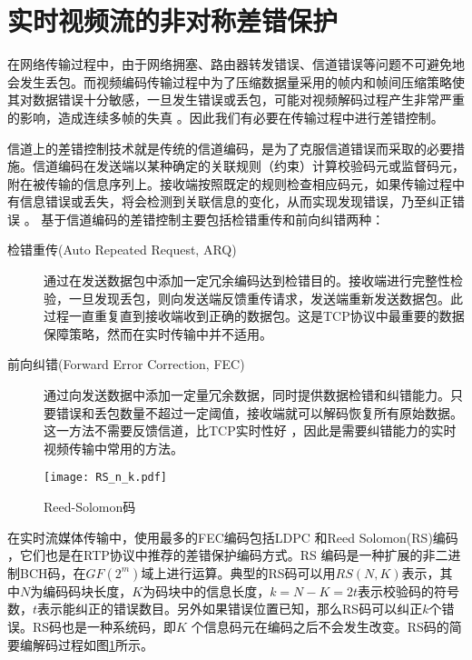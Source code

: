 \section{实时视频流的非对称差错保护}
\label{section:fec_intro}
在网络传输过程中，由于网络拥塞、路由器转发错误、信道错误等问题不可避免地会发生丢包。而视频编码传输过程中为了压缩数据量采用的帧内和帧间压缩策略使其对数据错误十分敏感，一旦发生错误或丢包，可能对视频解码过程产生非常严重的影响，造成连续多帧的失真 \cite{stockhammer2003h}。因此我们有必要在传输过程中进行差错控制。

信道上的差错控制技术就是传统的信道编码，是为了克服信道错误而采取的必要措施。信道编码在发送端以某种确定的关联规则（约束）计算校验码元或监督码元，附在被传输的信息序列上。接收端按照既定的规则检查相应码元，如果传输过程中有信息错误或丢失，将会检测到关联信息的变化，从而实现发现错误，乃至纠正错误 \cite{陈敏2004网络实时视频传输研究, wang1998error, wang2000error} 。
基于信道编码的差错控制主要包括检错重传和前向纠错两种：
\begin{description}
    \item[检错重传(Auto Repeated Request, ARQ) \cite{soltani2009delay, schier2012optimizing}] 通过在发送数据包中添加一定冗余编码达到检错目的。接收端进行完整性检验，一旦发现丢包，则向发送端反馈重传请求，发送端重新发送数据包。此过程一直重复直到接收端收到正确的数据包。这是TCP协议中最重要的数据保障策略，然而在实时传输中并不适用。
    \item[前向纠错(Forward Error Correction, FEC) \cite{nafaa2008forward}] 通过向发送数据中添加一定量冗余数据，同时提供数据检错和纠错能力。只要错误和丢包数量不超过一定阈值，接收端就可以解码恢复所有原始数据。这一方法不需要反馈信道，比TCP实时性好 \cite{davis1996joint}，因此是需要纠错能力的实时视频传输中常用的方法。
\end{description}

\begin{figure}[htbp]
  \centering
  \texttt{[image: RS\_n\_k.pdf]}
  \caption{Reed-Solomon码}
  \label{fig:RS_n_k}
\end{figure}

在实时流媒体传输中，使用最多的FEC编码包括LDPC \cite{richardson2003error}和Reed Solomon(RS)编码 \cite{wicker1999reed}，它们也是在RTP协议中推荐的差错保护编码方式。RS 编码是一种扩展的非二进制BCH码，在$GF(2^m)$域上进行运算。典型的RS码可以用$RS(N,K)$表示，其中$N$为编码码块长度，$K$为码块中的信息长度，$k=N-K=2t$表示校验码的符号数，$t$表示能纠正的错误数目。另外如果错误位置已知，那么RS码可以纠正$k$个错误。RS码也是一种系统码，即$K$ 个信息码元在编码之后不会发生改变。RS码的简要编解码过程如图\ref{fig:RS_n_k}所示。

